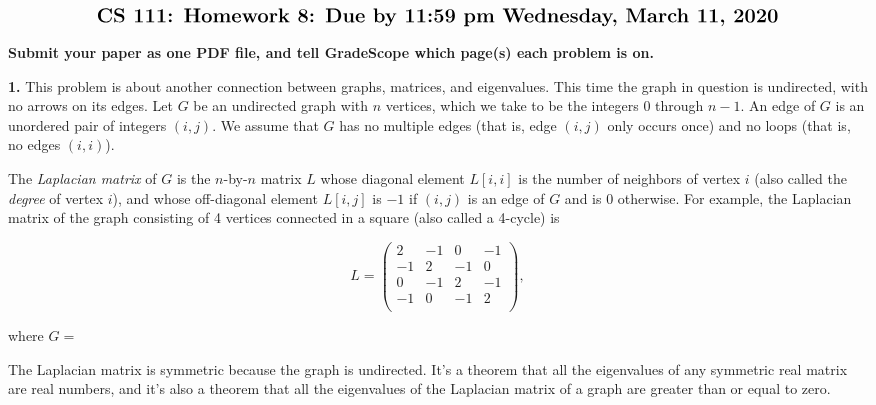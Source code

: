 \documentclass[11pt]{article}
\begin{document}
$$\mbox{\Large \bf CS 111: Homework 8: Due by 11:59 pm Wednesday, March 11, 2020}$$
\par\smallskip\noindent
{\bf Submit your paper as one PDF file,
and tell GradeScope which page(s) each problem is on.}

\par\bigskip
{\bf 1.}
This problem is about another connection between graphs, matrices,
and eigenvalues.
This time the graph in question is undirected, with no arrows on its edges.
Let $G$ be an undirected graph with $n$ vertices, 
which we take to be the integers 0 through $n-1$.
An edge of $G$ is an unordered pair of integers $(i,j)$.
We assume that $G$ has no multiple edges 
(that is, edge $(i,j)$ only occurs once)
and no loops (that is, no edges $(i,i)$).

The {\em Laplacian matrix} of $G$ is the $n$-by-$n$ matrix $L$ 
whose diagonal element $L[i, i]$ is the number of neighbors of vertex $i$
(also called the {\em degree} of vertex $i$),
and whose off-diagonal element $L[i, j]$ 
is $-1$ if $(i,j)$ is an edge of $G$ and is $0$ otherwise.
For example, the Laplacian matrix of the graph consisting of 4 vertices
connected in a square (also called a 4-cycle) is
\par\smallskip\noindent

\begin{minipage}{.45\textwidth}
$$ 
L = \left(
\begin{array}{cccc}
 2 & -1 &  0 & -1 \\    
-1 &  2 & -1 &  0 \\    
 0 & -1 &  2 & -1 \\    
-1 &  0 & -1 &  2 \\    
\end{array} 
\right),
$$
\end{minipage}
\hspace{0.4in}
where 
\hspace{0.03in}
$G=$
\begin{minipage}{.45\textwidth}
\end{minipage}

\par\smallskip\noindent
The Laplacian matrix is symmetric because the graph is undirected.
It's a theorem that all the eigenvalues of any symmetric real matrix are real numbers,
and it's also a theorem that all the eigenvalues of the Laplacian matrix
of a graph are greater than or equal to zero.
\end{document}
